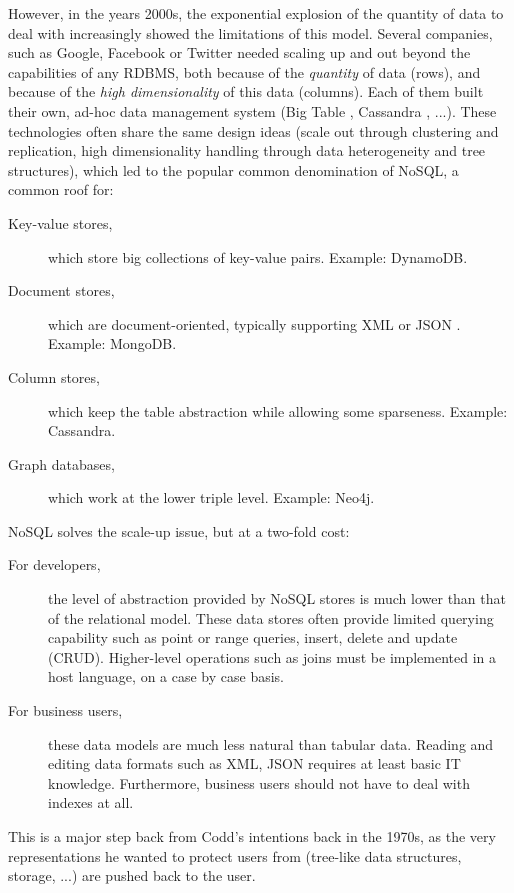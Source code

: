 \documentclass{acm_proc_article-sp}
\begin{document}
However, in the years 2000s, the exponential explosion of the quantity of data to deal with increasingly showed the limitations of this model. Several companies, such as Google, Facebook or Twitter needed scaling up and out beyond the capabilities of any RDBMS, both because of the \emph{quantity} of data (rows), and because of the \emph{high dimensionality} of this data (columns). Each of them built their own, ad-hoc data management system (Big Table \cite{Chang2008}, Cassandra \cite{Lakshman2010}, ...). These technologies often share the same design ideas (scale out through clustering and replication, high dimensionality handling through data heterogeneity and tree structures), which led to the popular common denomination of NoSQL, a common roof for:
\begin{description}
\item[Key-value stores,] which store big collections of key-value pairs. Example: DynamoDB.
\item[Document stores,] which are document-oriented, typically supporting XML \cite{XML} or JSON \cite{JSON}. Example: MongoDB.
\item[Column stores,] which keep the table abstraction while allowing some sparseness. Example: Cassandra.
\item[Graph databases,] which work at the lower triple level. Example: Neo4j.
\end{description}

NoSQL solves the scale-up issue, but at a two-fold cost:
\begin{description}
\item[For developers,] the level of abstraction provided by NoSQL stores is much lower than that of the relational model. These data stores often provide limited querying capability such as point or range queries, insert, delete and update (CRUD). Higher-level operations such as joins must be implemented in a host language, on a case by case basis.
\item[For business users,] these data models are much less natural than tabular data. Reading and editing data formats such as XML, JSON requires at least basic IT knowledge. Furthermore, business users should not have to deal with indexes at all.
\end{description}

This is a major step back from Codd's intentions back in the 1970s, as the very representations he wanted to protect users from (tree-like data structures, storage, ...) are pushed back to the user.
\end{document}
